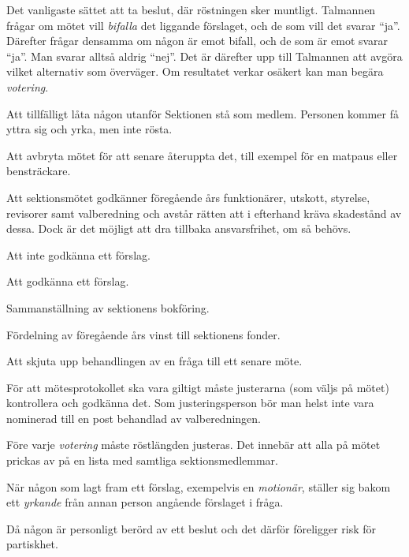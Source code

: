 \documentclass[../_main/handlingar.tex]{subfiles}
\begin{document}
\begin{description}[style=multiline, leftmargin=45mm]
    \item[Acklamation]
    Det vanligaste sättet att ta beslut, där röstningen sker muntligt. Talmannen frågar om mötet vill \emph{bifalla} det liggande förslaget, och de som vill det svarar ``ja''. Därefter frågar densamma om någon är emot bifall, och de som är emot svarar ``ja''. Man svarar alltså aldrig ``nej''. Det är därefter upp till Talmannen att avgöra vilket alternativ som överväger. Om resultatet verkar osäkert kan man begära \emph{votering}.
    \item[Adjungera]
    Att tillfälligt låta någon utanför Sektionen stå som medlem. Personen kommer få yttra sig och yrka, men inte rösta.
    \item[Ajournera]
    Att avbryta mötet för att senare återuppta det, till exempel för en matpaus eller bensträckare.
    \item[Ansvarsfrihet]
    Att sektionsmötet godkänner föregående års funktionärer, utskott, styrelse, revisorer samt valberedning och avstår rätten att i efterhand kräva skadestånd av dessa. Dock är det möjligt att dra tillbaka ansvarsfrihet, om så behövs.
    \item[Avslag]
    Att inte godkänna ett förslag.
    \item[Bifall]
    Att godkänna ett förslag.
    \item[Bokslut]
    Sammanställning av sektionens bokföring.
    \item[Bokslutsdisposition]
    Fördelning av föregående års vinst till sektionens fonder.
    \item[Bordläggning]
    Att skjuta upp behandlingen av en fråga till ett senare möte.
    \item[Justering av protokoll]
    För att mötesprotokollet ska vara giltigt måste justerarna (som väljs på mötet) kontrollera och godkänna det. Som justeringsperson bör man helst inte vara nominerad till en post behandlad av valberedningen.
    \item[Justering av röstlängd]
    Före varje \emph{votering} måste röstlängden justeras. Det innebär att alla på mötet prickas av på en lista med samtliga sektionsmedlemmar.
    \item[Jämka sig] När någon som lagt fram ett förslag, exempelvis en \emph{motionär}, ställer sig bakom ett \emph{yrkande} från annan person angående förslaget i fråga.
    \item[Jäv]
    Då någon är personligt berörd av ett beslut och det därför föreligger risk för partiskhet.

\end{description}
\end{document}
